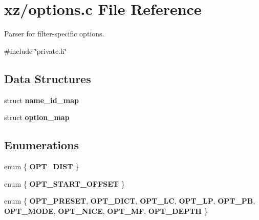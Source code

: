 \section{xz/options.c File Reference}
\label{options_8c}


Parser for filter-\/specific options.  


{\ttfamily \#include \char`\"{}private.\+h\char`\"{}}\newline
\subsection*{Data Structures}
\begin{DoxyCompactItemize}
\item 
struct \textbf{ name\+\_\+id\+\_\+map}
\item 
struct \textbf{ option\+\_\+map}
\end{DoxyCompactItemize}
\subsection*{Enumerations}
\begin{DoxyCompactItemize}
\item 
\mbox{\label{options_8c_ae4d5251432e1a9e6803c0240cc492e18}} 
enum \{ {\bfseries O\+P\+T\+\_\+\+D\+I\+ST}
 \}
\item 
\mbox{\label{options_8c_a7ff5f2dff38e7639981794c43dc9167b}} 
enum \{ {\bfseries O\+P\+T\+\_\+\+S\+T\+A\+R\+T\+\_\+\+O\+F\+F\+S\+ET}
 \}
\item 
\mbox{\label{options_8c_aabfcbcb5ac86a1edac4035264bc7d2b8}} 
enum \{ \newline
{\bfseries O\+P\+T\+\_\+\+P\+R\+E\+S\+ET}, 
{\bfseries O\+P\+T\+\_\+\+D\+I\+CT}, 
{\bfseries O\+P\+T\+\_\+\+LC}, 
{\bfseries O\+P\+T\+\_\+\+LP}, 
\newline
{\bfseries O\+P\+T\+\_\+\+PB}, 
{\bfseries O\+P\+T\+\_\+\+M\+O\+DE}, 
{\bfseries O\+P\+T\+\_\+\+N\+I\+CE}, 
{\bfseries O\+P\+T\+\_\+\+MF}, 
\newline
{\bfseries O\+P\+T\+\_\+\+D\+E\+P\+TH}
 \}
\end{DoxyCompactItemize}
